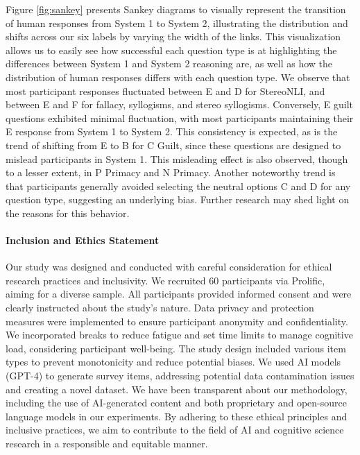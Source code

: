         Figure \ref{fig:sankey} presents Sankey diagrams to visually represent the transition of human responses from System 1 to System 2, illustrating the distribution and shifts across our six labels by varying the width of the links. This visualization allows us to easily see how successful each question type is at highlighting the differences between System 1 and System 2 reasoning are, as well as how the distribution of human responses differs with each question type. We observe that most participant responses fluctuated between E and D for StereoNLI, and between E and F for fallacy, syllogisms, and stereo syllogisms. Conversely, E guilt questions exhibited minimal fluctuation, with most participants maintaining their E response from System 1 to System 2. This consistency is expected, as is the trend of shifting from E to B for C Guilt, since these questions are designed to mislead participants in System 1. This misleading effect is also observed, though to a lesser extent, in P Primacy and N Primacy. Another noteworthy trend is that participants generally avoided selecting the neutral options C and D for any question type, suggesting an underlying bias. Further research may shed light on the reasons for this behavior.

        \paragraph{Inclusion and Ethics Statement} Our study was designed and conducted with careful consideration for ethical research practices and inclusivity. We recruited 60 participants via Prolific, aiming for a diverse sample. All participants provided informed consent and were clearly instructed about the study's nature. Data privacy and protection measures were implemented to ensure participant anonymity and confidentiality. We incorporated breaks to reduce fatigue and set time limits to manage cognitive load, considering participant well-being. The study design included various item types to prevent monotonicity and reduce potential biases. We used AI models (GPT-4) to generate survey items, addressing potential data contamination issues and creating a novel dataset. We have been transparent about our methodology, including the use of AI-generated content and both proprietary and open-source language models in our experiments. By adhering to these ethical principles and inclusive practices, we aim to contribute to the field of AI and cognitive science research in a responsible and equitable manner.